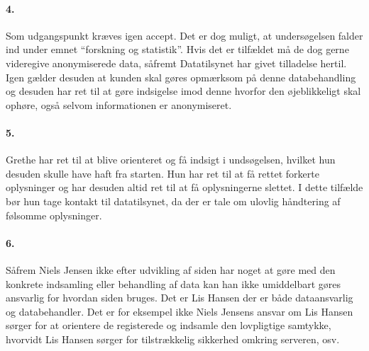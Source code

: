 \paragraph{4.} Som udgangspunkt kræves igen accept. Det er dog muligt, at
undersøgelsen falder ind under emnet ``forskning og statistik''. Hvis det er
tilfældet må de dog gerne videregive anonymiserede data, såfremt Datatilsynet
har givet tilladelse hertil. Igen gælder desuden at kunden skal gøres opmærksom
på denne databehandling og desuden har ret til at gøre indsigelse imod denne
hvorfor den øjeblikkeligt skal ophøre, også selvom informationen er anonymiseret.

\paragraph{5.} Grethe har ret til at blive orienteret og få indsigt i
undsøgelsen, hvilket hun desuden skulle have haft fra starten.
Hun har ret til at få rettet forkerte oplysninger og har desuden
altid ret til at få oplysningerne slettet. I dette tilfælde bør hun
tage kontakt til datatilsynet, da der er tale om ulovlig håndtering
af følsomme oplysninger.

\paragraph{6.}
Såfrem Niels Jensen ikke efter udvikling af siden har noget at gøre med den
konkrete indsamling eller behandling af data kan han ikke umiddelbart gøres
ansvarlig for hvordan siden bruges. Det er Lis Hansen der er både dataansvarlig og
databehandler. Det er for eksempel ikke Niels Jensens ansvar om Lis Hansen
sørger for at orientere de registerede og indsamle den lovpligtige samtykke,
hvorvidt Lis Hansen sørger for tilstrækkelig sikkerhed omkring serveren, osv.

